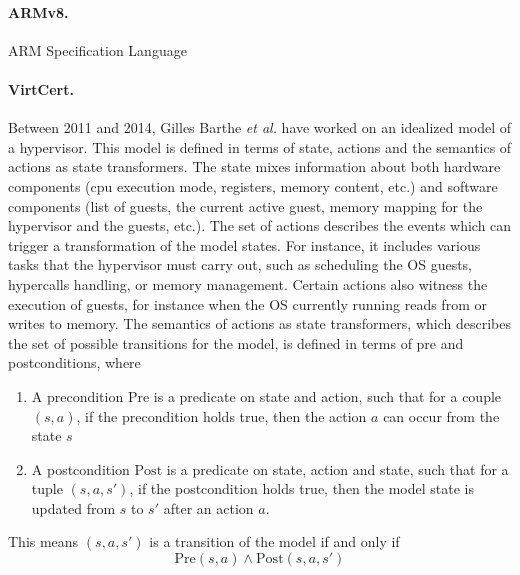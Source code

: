 \paragraph{ARMv8.}
%
ARM Specification Language
%

\paragraph{VirtCert.}
%
Between 2011 and 2014, Gilles Barthe \emph{et al.} have worked on an idealized
model of a hypervisor.
%
This model is defined in terms of state, actions and the semantics of actions as
state trans\-formers.
%
The state mixes information about both hardware components (\ac{cpu} execution
mode, registers, memory content, etc.) and software components (list of guests,
the current active guest, memory mapping for the hypervisor and the guests, etc.).
%
The set of actions describes the events which can trigger a transformation of
the model states.
%
For instance, it includes various tasks that the hypervisor must carry out, such
as scheduling the OS guests, hypercalls handling, or memory management.
%
Certain actions also witness the execution of guests, for instance when the OS
currently running reads from or writes to memory.
%
The semantics of actions as state transformers, which describes the set of
possible transitions for the model, is defined in terms of pre and
postconditions, where
%
\begin{enumerate}
\item A precondition \( \mathrm{Pre} \) is a predicate on state and action, such
  that for a couple \( (s, a) \), if the precondition holds true, then the
  action \( a \) can occur from the state \( s \)
\item A postcondition \( \mathrm{Post} \) is a predicate on state, action and
  state, such that for a tuple \( (s, a, s') \), if the postcondition holds
  true, then the model state is updated from \( s \) to \( s' \) after an action
  \( a \).
\end{enumerate}
%
This means \( (s, a, s') \) is a transition of the model if and only if
%
\[
  \mathrm{Pre}(s, a) \wedge \mathrm{Post}(s, a, s')
\]

